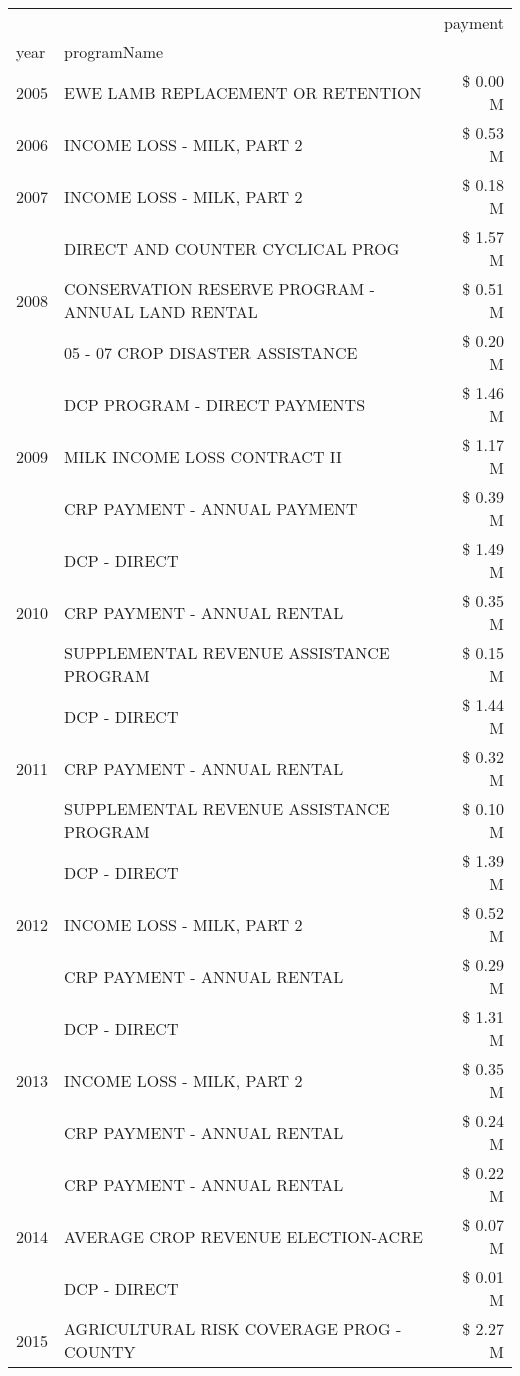 \begin{tabular}{llr}
\toprule
 &  & payment \\
year & programName &  \\
\midrule
2005 & EWE LAMB REPLACEMENT OR RETENTION & \$ 0.00 M \\
\cline{1-3}
2006 & INCOME LOSS - MILK, PART 2 & \$ 0.53 M \\
\cline{1-3}
2007 & INCOME LOSS - MILK, PART 2 & \$ 0.18 M \\
\cline{1-3}
\multirow[t]{3}{*}{2008} & DIRECT AND COUNTER CYCLICAL PROG & \$ 1.57 M \\
 & CONSERVATION RESERVE PROGRAM - ANNUAL LAND RENTAL & \$ 0.51 M \\
 & 05 - 07 CROP DISASTER ASSISTANCE & \$ 0.20 M \\
\cline{1-3}
\multirow[t]{3}{*}{2009} & DCP PROGRAM - DIRECT PAYMENTS & \$ 1.46 M \\
 & MILK INCOME LOSS CONTRACT II & \$ 1.17 M \\
 & CRP PAYMENT - ANNUAL PAYMENT & \$ 0.39 M \\
\cline{1-3}
\multirow[t]{3}{*}{2010} & DCP - DIRECT & \$ 1.49 M \\
 & CRP PAYMENT - ANNUAL RENTAL & \$ 0.35 M \\
 & SUPPLEMENTAL REVENUE ASSISTANCE PROGRAM & \$ 0.15 M \\
\cline{1-3}
\multirow[t]{3}{*}{2011} & DCP - DIRECT & \$ 1.44 M \\
 & CRP PAYMENT - ANNUAL RENTAL & \$ 0.32 M \\
 & SUPPLEMENTAL REVENUE ASSISTANCE PROGRAM & \$ 0.10 M \\
\cline{1-3}
\multirow[t]{3}{*}{2012} & DCP - DIRECT & \$ 1.39 M \\
 & INCOME LOSS - MILK, PART 2 & \$ 0.52 M \\
 & CRP PAYMENT - ANNUAL RENTAL & \$ 0.29 M \\
\cline{1-3}
\multirow[t]{3}{*}{2013} & DCP - DIRECT & \$ 1.31 M \\
 & INCOME LOSS - MILK, PART 2 & \$ 0.35 M \\
 & CRP PAYMENT - ANNUAL RENTAL & \$ 0.24 M \\
\cline{1-3}
\multirow[t]{3}{*}{2014} & CRP PAYMENT - ANNUAL RENTAL & \$ 0.22 M \\
 & AVERAGE CROP REVENUE ELECTION-ACRE & \$ 0.07 M \\
 & DCP - DIRECT & \$ 0.01 M \\
\cline{1-3}
\multirow[t]{2}{*}{2015} & AGRICULTURAL RISK COVERAGE PROG - COUNTY & \$ 2.27 M \\

\end{tabular}
